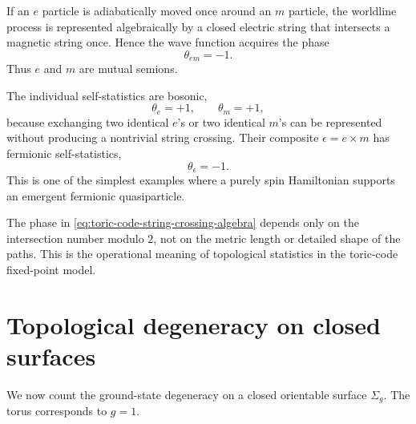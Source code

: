 If an \(e\) particle is adiabatically moved once around an \(m\) particle, the
worldline process is represented algebraically by a closed electric string that
intersects a magnetic string once.  Hence the wave function acquires the phase
\begin{equation}
\label{eq:toric-code-mutual-minus-one}
    \theta_{em}=-1 .
\end{equation}
Thus \(e\) and \(m\) are mutual semions.

The individual self-statistics are bosonic,
\begin{equation}
\label{eq:toric-code-self-statistics}
    \theta_e=+1,
    \qquad
    \theta_m=+1,
\end{equation}
because exchanging two identical \(e\)'s or two identical \(m\)'s can be
represented without producing a nontrivial string crossing.  Their composite
\(\epsilon=e\times m\) has fermionic self-statistics,
\begin{equation}
\label{eq:toric-code-epsilon-fermion}
    \theta_{\epsilon}=-1 .
\end{equation}
This is one of the simplest examples where a purely spin Hamiltonian supports an
emergent fermionic quasiparticle.

\begin{remark}
The phase in \cref{eq:toric-code-string-crossing-algebra} depends only on the
intersection number modulo \(2\), not on the metric length or detailed shape of
the paths.  This is the operational meaning of topological statistics in the
toric-code fixed-point model.
\end{remark}

\section{Topological degeneracy on closed surfaces}
\label{sec:toric-code-topological-degeneracy}

We now count the ground-state degeneracy on a closed orientable surface
\(\Sigma_g\).  The torus corresponds to \(g=1\).

